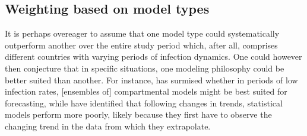 \subsection{Weighting based on model types}
It is perhaps overeager to assume that one model type could systematically outperform another over the entire study period which, after all, comprises different countries with varying periods of infection dynamics. One could however then conjecture that in specific situations, one modeling philosophy could be better suited than another. For instance, \citep{taylor_combining_2021} has surmised whether in periods of low infection rates, [ensembles of] compartmental models might be best suited for forecasting, while \citep{bracher_pre-registered_2021} have identified that following changes in trends, statistical models perform more poorly, likely because they first have to observe the changing trend in the data from which they extrapolate.


